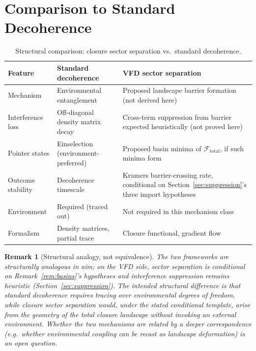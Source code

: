 \documentclass[12pt]{article}
\newtheorem{remark}[theorem]{Remark}
\newcommand{\Fcal}{\mathcal{F}}
\begin{document}
\section{Comparison to Standard Decoherence}\label{sec:comparison}

\begin{table}[ht]
\centering
\caption{Structural comparison: closure sector separation vs.\ standard decoherence.}
\label{tab:comparison}
\begin{tabular}{@{}lll@{}}
\toprule
Feature & Standard decoherence & VFD sector separation \\
\midrule
Mechanism & Environmental entanglement & Proposed landscape barrier formation (not derived here) \\
Interference loss & Off-diagonal density matrix decay & Cross-term suppression from barrier expected heuristically (not proved here) \\
Pointer states & Einselection (environment-preferred) & Proposed basin minima of $\Fcal_{\mathrm{total}}$, if such minima form \\
Outcome stability & Decoherence timescale & Kramers barrier-crossing rate, conditional on Section~\ref{sec:suppression}'s three import hypotheses \\
Environment & Required (traced out) & Not required in this mechanism class \\
Formalism & Density matrices, partial trace & Closure functional, gradient flow \\
\bottomrule
\end{tabular}
\end{table}

\begin{remark}[Structural analogy, not equivalence]
The two frameworks are structurally analogous in aim; on the VFD side, sector separation is conditional on Remark~\ref{rem:basins}'s hypotheses and interference suppression remains heuristic (Section~\ref{sec:suppression}). The intended structural difference is that standard decoherence requires tracing over environmental degrees of freedom, while closure sector separation would, under the stated conditional template, arise from the geometry of the total closure landscape without invoking an external environment. Whether the two mechanisms are related by a deeper correspondence (e.g.\ whether environmental coupling can be recast as landscape deformation) is an open question.
\end{remark}
\end{document}

